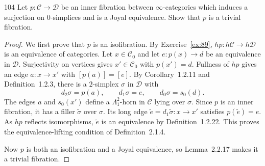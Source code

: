 \begin{exercise}{104}
Let $p\colon\mathcal C\to\mathcal D$ be an inner fibration between
$\infty$-categories which induces a surjection on $0$-simplices and is a
Joyal equivalence. Show that $p$ is a trivial fibration.

\begin{proof}
We first prove that $p$ is an isofibration.
By Exercise~\ref{ex:89}, $hp\colon h\mathcal C\to h\mathcal D$ is an
equivalence of categories.
Let $x\in\mathcal C_0$ and let $e\colon p(x)\to d$ be an equivalence
in $\mathcal D$.
Surjectivity on vertices gives $x'\in\mathcal C_0$ with $p(x')=d$.
Fullness of $hp$ gives an edge $a\colon x\to x'$ with $[p(a)]=[e]$.
By Corollary~1.2.11 and Definition~1.2.3, there is a $2$-simplex
$\sigma$ in $\mathcal D$ with
\[
 d_2\sigma=p(a),\qquad d_1\sigma=e,\qquad d_0\sigma=s_0(d).
\]
The edges $a$ and $s_0(x')$ define a $\Lambda^2_1$-horn in
$\mathcal C$ lying over $\sigma$.
Since $p$ is an inner fibration, it has a filler $\widetilde\sigma$
over $\sigma$.
Its long edge $\widetilde e=d_1\widetilde\sigma\colon x\to x'$ satisfies
$p(\widetilde e)=e$.
As $hp$ reflects isomorphisms, $\widetilde e$ is an equivalence by
Definition~1.2.22.
This proves the equivalence-lifting condition of Definition~2.1.4.

Now $p$ is both an isofibration and a Joyal equivalence, so
Lemma~2.2.17 makes it a trivial fibration.
\end{proof}
\end{exercise}
